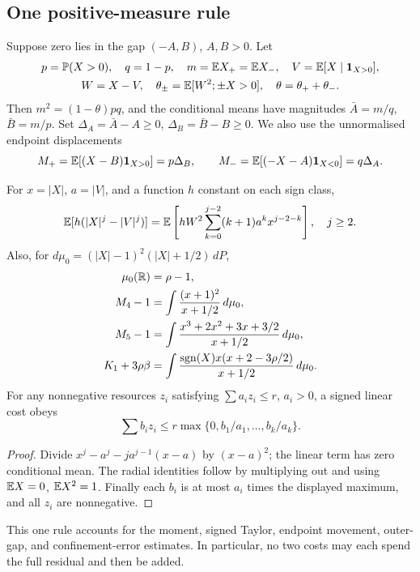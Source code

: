 \subsection{One positive-measure rule}
Suppose zero lies in the gap $(-A,B)$, $A,B>0$. Let
\[\begin{gathered}
 p=\mathbb P(X>0),\quad q=1-p,\quad m=\mathbb E X_+=\mathbb E X_-,\quad V=\mathbb E[X\mid\mathbf1_{X>0}],\\
 W=X-V,\quad\theta_\pm=\mathbb E[W^2;\pm X>0],\quad\theta=\theta_++\theta_-.
\end{gathered}\]
Then $m^2=(1-\theta)pq$, and the conditional means have magnitudes
$\bar A=m/q$, $\bar B=m/p$. Set
$\Delta_A=\bar A-A\ge0$, $\Delta_B=\bar B-B\ge0$.
We also use the unnormalised endpoint displacements
\[
 M_+=\mathbb E[(X-B)\mathbf1_{X>0}]=p\Delta_B,\qquad
 M_-=\mathbb E[(-X-A)\mathbf1_{X<0}]=q\Delta_A.
\]

\begin{lemma}\label{re:pricing}
For $x=|X|$, $a=|V|$, and a function $h$ constant on each sign class,
\begin{equation}\label{re:conditional}
 \mathbb E[h(|X|^j-|V|^j)]
 =\mathbb E\left[hW^2\sum_{k=0}^{j-2}(k+1)a^kx^{j-2-k}\right],\quad j\ge2.
\end{equation}
Also, for $d\mu_0=(|X|-1)^2(|X|+1/2)\,dP$,
\begin{align*}
 \mu_0(\mathbb R)&=\rho-1,\\
 M_4-1&=\int\frac{(x+1)^2}{x+1/2}\,d\mu_0,\\
 M_5-1&=\int\frac{x^3+2x^2+3x+3/2}{x+1/2}\,d\mu_0,\\
 K_1+3\rho\beta&=\int
  \frac{\operatorname{sgn}(X)x(x+2-3\rho/2)}{x+1/2}\,d\mu_0.
\end{align*}
For any nonnegative resources $z_i$ satisfying $\sum a_i z_i\le r$,
$a_i>0$, a signed linear cost obeys
\begin{equation}\label{re:simplex}
 \sum b_i z_i\le r\max\{0,b_1/a_1,\ldots,b_k/a_k\}.
\end{equation}
\end{lemma}
\begin{proof}
Divide $x^j-a^j-ja^{j-1}(x-a)$ by $(x-a)^2$; the linear term has
zero conditional mean. The radial identities follow by multiplying
out and using $\mathbb E X=0$, $\mathbb E X^2=1$. Finally each $b_i$ is at most
$a_i$ times the displayed maximum, and all $z_i$ are nonnegative.
\end{proof}

This one rule accounts for the moment, signed Taylor, endpoint movement,
outer-gap, and confinement-error estimates. In particular, no two costs
may each spend the full residual and then be added.

